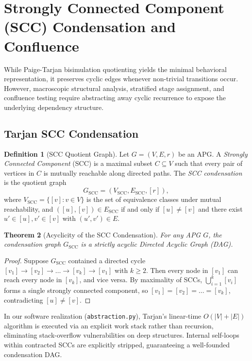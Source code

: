 \documentclass[11pt]{article}
\newtheorem{theorem}{Theorem}[section]
\theoremstyle{definition}
\newtheorem{definition}[theorem]{Definition}
\newcommand{\SCC}{\operatorname{SCC}}
\begin{document}
\section{Strongly Connected Component (SCC) Condensation and Confluence}
While Paige-Tarjan bisimulation quotienting yields the minimal behavioral representation, it preserves cyclic edges whenever non-trivial transitions occur. However, macroscopic structural analysis, stratified stage assignment, and confluence testing require abstracting away cyclic recurrence to expose the underlying dependency structure.

\subsection{Tarjan SCC Condensation}
\begin{definition}[SCC Quotient Graph]
Let $G = (V, E, r)$ be an APG. A \emph{Strongly Connected Component} (SCC) is a maximal subset $C \subseteq V$ such that every pair of vertices in $C$ is mutually reachable along directed paths. The \emph{SCC condensation} is the quotient graph
\[
G_{\SCC} = (V_{\SCC}, E_{\SCC}, [r]),
\]
where $V_{\SCC} = \{[v] : v \in V\}$ is the set of equivalence classes under mutual reachability, and $([u], [v]) \in E_{\SCC}$ if and only if $[u] \ne [v]$ and there exist $u' \in [u], v' \in [v]$ with $(u', v') \in E$.
\end{definition}

\begin{theorem}[Acyclicity of the SCC Condensation]
For any APG $G$, the condensation graph $G_{\SCC}$ is a strictly acyclic Directed Acyclic Graph (DAG).
\end{theorem}
\begin{proof}
Suppose $G_{\SCC}$ contained a directed cycle $[v_1] \to [v_2] \to \dots \to [v_k] \to [v_1]$ with $k \ge 2$. Then every node in $[v_1]$ can reach every node in $[v_k]$, and vice versa. By maximality of SCCs, $\bigcup_{i=1}^k [v_i]$ forms a single strongly connected component, so $[v_1] = [v_2] = \dots = [v_k]$, contradicting $[u] \ne [v]$.
\end{proof}

In our software realization (\texttt{abstraction.py}), Tarjan's linear-time $O(|V| + |E|)$ algorithm is executed via an explicit work stack rather than recursion, eliminating stack-overflow vulnerabilities on deep structures. Internal self-loops within contracted SCCs are explicitly stripped, guaranteeing a well-founded condensation DAG.
\end{document}
